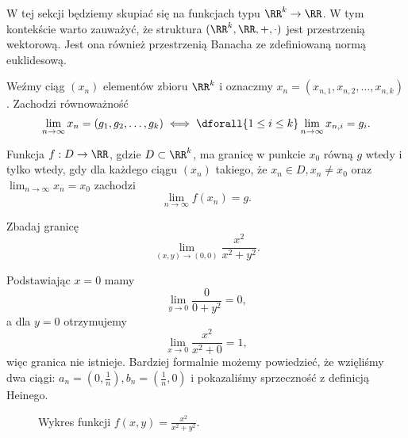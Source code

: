 W tej sekcji będziemy skupiać się na funkcjach typu $\RR^k \to \RR$. W tym kontekście warto zauważyć, że struktura $(\RR^k, \RR, +, \cdot)$ jest przestrzenią wektorową. Jest ona również przestrzenią Banacha ze zdefiniowaną normą euklidesową.

\begin{fact}
    Weźmy ciąg $(x_n)$ elementów zbioru $\RR^k$ i oznaczmy $x_n = (x_{n,1}, x_{n,2}, \ldots, x_{n,k})$. Zachodzi równoważność
    \[ \lim_{n\to\infty} x_n = (g_1, g_2, \ldots, g_k) \iff \dforall{1\leq i\leq k} \lim_{n\to\infty}x_{n,i} = g_i. \]
\end{fact}

\begin{definition}[Heinego]
    Funkcja $f : D \to \RR$, gdzie $D\subset\RR^k$, ma granicę w punkcie $x_0$ równą $g$ wtedy i tylko wtedy, gdy dla każdego ciągu $(x_n)$ takiego, że $x_n \in D, x_n \neq x_0$ oraz $\lim_{n\to\infty} x_n = x_0$ zachodzi
    \[ \lim_{n\to\infty} f(x_n) = g. \]
\end{definition}

\begin{example}
    Zbadaj granicę
    \[ \lim_{(x, y)\to (0, 0)} \frac{x^2}{x^2 + y^2}. \]
\end{example}
\begin{solution}
    Podstawiając $x = 0$ mamy
    \[ \lim_{y\to 0} \frac{0}{0 + y^2} = 0, \]
    a dla $y = 0$ otrzymujemy
    \[ \lim_{x\to 0} \frac{x^2}{x^2 + 0} = 1, \]
    więc granica nie istnieje. Bardziej formalnie możemy powiedzieć, że wzięliśmy dwa ciągi: $a_n = (0, \frac{1}{n}), b_n = (\frac{1}{n}, 0)$ i pokazaliśmy sprzeczność z definicją Heinego.
\end{solution}

\begin{figure}[H]
    \centering
    \caption{Wykres funkcji $f(x, y) = \frac{x^2}{x^2 + y^2}$.}
\end{figure}

